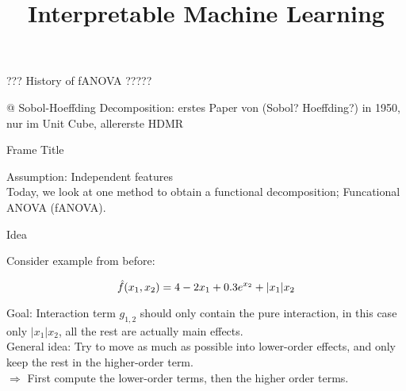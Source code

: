 \documentclass[11pt,compress,t,notes=noshow, aspectratio=169, xcolor=table]{beamer}
\title{Interpretable Machine Learning}
\date{}
\begin{document}
\newcommand{\titlefigure}{figure/open_blackbox}
\newcommand{\learninggoals}{
\item Understand one classical kind of functional decomposition: functional ANOVA (fANOVA).
\item [...]
\item Algorithm for calculating the components in a fANOVA}


\begin{frame}{??? History of fANOVA ?????}

@ Sobol-Hoeffding Decomposition: erstes Paper von (Sobol? Hoeffding?) in 1950, nur im Unit Cube, allererste HDMR
    
\end{frame}

\begin{frame}{Frame Title}

    Assumption: Independent features \\
    Today, we look at one method to obtain a functional decomposition; Funcational ANOVA (fANOVA).
    
\end{frame}

\begin{frame}{Idea}

    Consider example from before:

    \begin{equation}
        \hat{f}(x_1, x_2) = 4 - 2x_1 + 0.3 e^{x_2} + |x_1|x_2
    \end{equation}

    Goal: Interaction term \(g_{1,2}\) should only contain the pure interaction, in this case only \(|x_1|x_2\), all the rest are actually main effects. \\
    General idea: Try to move as much as possible into lower-order effects, and only keep the rest in the higher-order term. \\
    \(\Rightarrow\) First compute the lower-order terms, then the higher order terms.
    
\end{frame}
\end{document}
